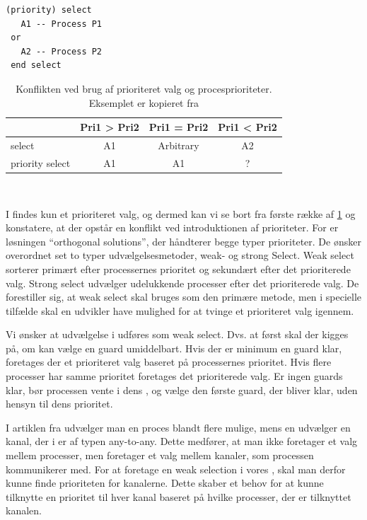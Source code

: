 \begin{lstlisting}[firstnumber=1 ,float=hbtp, label=lst:pri-select, caption={(priority) select. Eksemplet er kopieret fra \cite{Burns1990}}]
(priority) select
   A1 -- Process P1
 or
   A2 -- Process P2
 end select
\end{lstlisting}

\begin{table}[htbp]
	\centering
	\begin{tabular}{lccc}
       	\toprule
        &Pri1 > Pri2 & Pri1 = Pri2 & Pri1 < Pri2\\
        \midrule
          	select          & A1 & Arbitrary    & A2 \\
		    priority select & A1 & A1           & ? \\    
        \bottomrule
        \end{tabular}
    \caption[]{Konflikten ved brug af prioriteret valg og procesprioriteter. Eksemplet er kopieret fra \cite[160]{Burns1990}}\\
    \label{tab:prioritizedSelect}
\end{table}

I \pycsp findes kun et prioriteret valg, og dermed kan vi se bort fra første række af \cref{tab:prioritizedSelect} og konstatere, at der opstår en konflikt ved introduktionen af prioriteter. For \citeauthor{Burns1990} er løsningen ``orthogonal solutions'', der håndterer begge typer prioriteter. De ønsker overordnet set to typer udvælgelsesmetoder, weak- og strong Select. Weak select sorterer primært efter processernes prioritet og sekundært efter det prioriterede valg. Strong select udvælger udelukkende processer efter det prioriterede valg. De forestiller sig, at weak select skal bruges som den primære metode, men i specielle tilfælde skal en udvikler have mulighed for at tvinge et prioriteret valg igennem.

Vi ønsker at udvælgelse i  udføres som weak select. Dvs. at først skal der kigges på, om  kan vælge en guard umiddelbart. Hvis der er minimum en guard klar, foretages der et prioriteret valg baseret på processernes prioritet. Hvis flere processer har samme prioritet foretages det prioriterede valg. Er ingen guards klar, bør processen vente i dens , og vælge den første guard, der bliver klar, uden hensyn til dens prioritet.

I artiklen fra \citeauthor{Burns1990} udvælger man en proces blandt flere mulige, mens en  udvælger en kanal, der i \pycsp er af typen any-to-any. Dette medfører, at man ikke  foretager et valg mellem processer, men foretager et valg mellem kanaler, som processen kommunikerer med. For at foretage en weak selection i vores , skal man derfor kunne finde prioriteten for kanalerne. Dette skaber et behov for at kunne tilknytte en prioritet til hver kanal baseret på hvilke processer, der er tilknyttet kanalen. 
\label{misc:kanal-prioritet}


